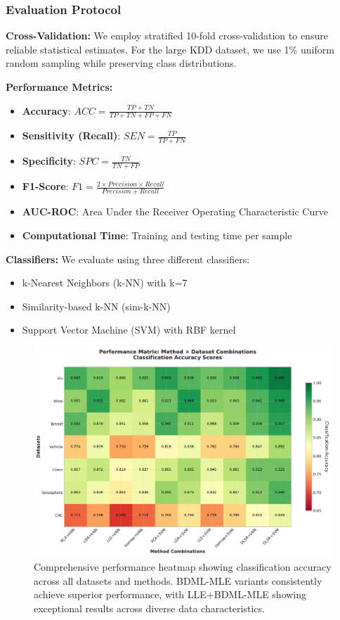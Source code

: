\documentclass[review]{elsarticle}
\begin{document}
\subsubsection{Evaluation Protocol}

\textbf{Cross-Validation:} We employ stratified 10-fold cross-validation to ensure reliable statistical estimates. For the large KDD dataset, we use 1\% uniform random sampling while preserving class distributions.

\textbf{Performance Metrics:} 
\begin{itemize}
\item \textbf{Accuracy}: $ACC = \frac{TP + TN}{TP + TN + FP + FN}$
\item \textbf{Sensitivity (Recall)}: $SEN = \frac{TP}{TP + FN}$  
\item \textbf{Specificity}: $SPC = \frac{TN}{TN + FP}$
\item \textbf{F1-Score}: $F1 = \frac{2 \times Precision \times Recall}{Precision + Recall}$
\item \textbf{AUC-ROC}: Area Under the Receiver Operating Characteristic Curve
\item \textbf{Computational Time}: Training and testing time per sample
\end{itemize}

\textbf{Classifiers:} We evaluate using three different classifiers:
\begin{itemize}
\item k-Nearest Neighbors (k-NN) with k=7
\item Similarity-based k-NN (sim-k-NN) 
\item Support Vector Machine (SVM) with RBF kernel
\end{itemize}

\begin{figure}[htbp]
\centering
\includegraphics[width=\textwidth]{performance_heatmap.pdf}
\caption{Comprehensive performance heatmap showing classification accuracy across all datasets and methods. BDML-MLE variants consistently achieve superior performance, with LLE+BDML-MLE showing exceptional results across diverse data characteristics.}
\label{fig:performance_heatmap}
\end{figure}
\end{document}
